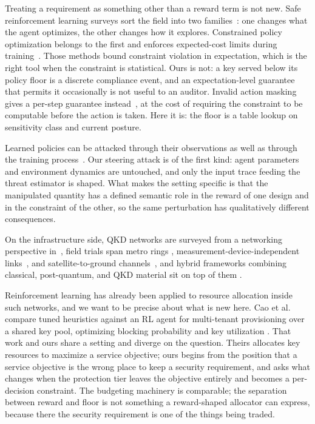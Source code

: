 \documentclass[conference]{IEEEtran}
\begin{document}
Treating a requirement as something other than a reward
term is not new. Safe reinforcement learning surveys sort the
field into two families~\cite{ref11}: one changes what the agent optimizes, the other changes how it explores. Constrained policy
optimization belongs to the first and enforces expected-cost
limits during training~\cite{ref12}. Those methods bound constraint
violation in expectation, which is the right tool when the
constraint is statistical. Ours is not: a key served below its
policy floor is a discrete compliance event, and an expectation-level guarantee that permits it occasionally is not useful to
an auditor. Invalid action masking gives a per-step guarantee
instead~\cite{ref10}, at the cost of requiring the constraint to be
computable before the action is taken. Here it is: the floor
is a table lookup on sensitivity class and current posture.

Learned policies can be attacked through their observations
\cite{ref9} as well as through the training process~\cite{ref13}. Our steering
attack is of the first kind: agent parameters and environment
dynamics are untouched, and only the input trace feeding the
threat estimator is shaped. What makes the setting specific is
that the manipulated quantity has a defined semantic role in
the reward of one design and in the constraint of the other, so
the same perturbation has qualitatively different consequences.

On the infrastructure side, QKD networks are surveyed from
a networking perspective in~\cite{ref5}, field trials span metro rings
\cite{ref4}, measurement-device-independent links~\cite{ref14}, and satellite-to-ground channels~\cite{ref15}, and hybrid frameworks combining
classical, post-quantum, and QKD material sit on top of them
\cite{ref16}.

Reinforcement learning has already been applied to resource
allocation inside such networks, and we want to be precise
about what is new here. Cao et al. compare tuned heuristics
against an RL agent for multi-tenant provisioning over a shared
key pool, optimizing blocking probability and key utilization
\cite{ref17}. That work and ours share a setting and diverge on the
question. Theirs allocates key resources to maximize a service
objective; ours begins from the position that a service objective
is the wrong place to keep a security requirement, and asks
what changes when the protection tier leaves the objective
entirely and becomes a per-decision constraint. The budgeting
machinery is comparable; the separation between reward and
floor is not something a reward-shaped allocator can express,
because there the security requirement is one of the things
being traded.
\end{document}
